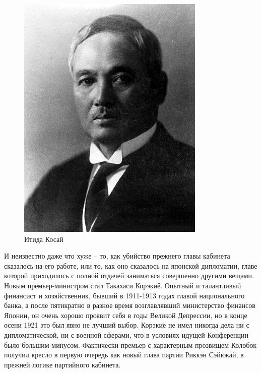 \begin{figure}[h!tb] 
	\centering\includegraphics[scale=0.5]{Glava7/d68MMABuGZw.jpg}
	\caption{Итида Косай}%
\end{figure}

И неизвестно даже что хуже – то, как убийство прежнего главы кабинета сказалось на его работе, или то, как оно сказалось на японской дипломатии, главе которой приходилось с полной отдачей заниматься совершенно другими вещами. Новым премьер-министром стал Такахаси Корэкиё. Опытный и талантливый финансист и хозяйственник, бывший в 1911-1913 годах главой национального банка, а после пятикратно в разное время возглавлявший министерство финансов Японии, он очень хорошо проявит себя в годы Великой Депрессии, но в конце осени 1921 это был явно не лучший выбор. Корэкиё не имел никогда дела ни с дипломатической, ни с военной сферами, что в условиях идущей Конференции было большим минусом. Фактически премьер с характерным прозвищем Колобок получил кресло в первую очередь как новый глава партии Риккэн Сэйюкай, в прежней логике партийного кабинета. 

